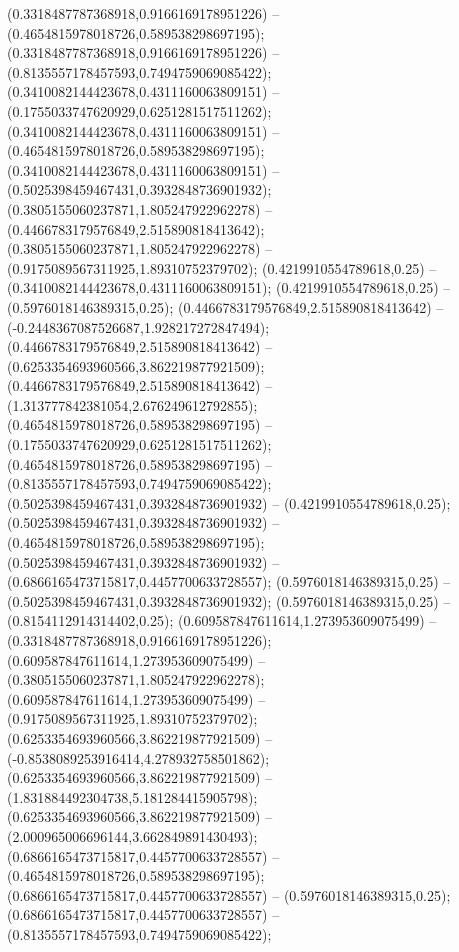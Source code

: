  (0.3318487787368918,0.9166169178951226) -- (0.4654815978018726,0.589538298697195);
 (0.3318487787368918,0.9166169178951226) -- (0.8135557178457593,0.7494759069085422);
 (0.3410082144423678,0.4311160063809151) -- (0.1755033747620929,0.6251281517511262);
 (0.3410082144423678,0.4311160063809151) -- (0.4654815978018726,0.589538298697195);
 (0.3410082144423678,0.4311160063809151) -- (0.5025398459467431,0.3932848736901932);
 (0.3805155060237871,1.805247922962278) -- (0.4466783179576849,2.515890818413642);
 (0.3805155060237871,1.805247922962278) -- (0.9175089567311925,1.89310752379702);
 (0.4219910554789618,0.25) -- (0.3410082144423678,0.4311160063809151);
 (0.4219910554789618,0.25) -- (0.5976018146389315,0.25);
 (0.4466783179576849,2.515890818413642) -- (-0.2448367087526687,1.928217272847494);
 (0.4466783179576849,2.515890818413642) -- (0.6253354693960566,3.862219877921509);
 (0.4466783179576849,2.515890818413642) -- (1.313777842381054,2.676249612792855);
 (0.4654815978018726,0.589538298697195) -- (0.1755033747620929,0.6251281517511262);
 (0.4654815978018726,0.589538298697195) -- (0.8135557178457593,0.7494759069085422);
 (0.5025398459467431,0.3932848736901932) -- (0.4219910554789618,0.25);
 (0.5025398459467431,0.3932848736901932) -- (0.4654815978018726,0.589538298697195);
 (0.5025398459467431,0.3932848736901932) -- (0.6866165473715817,0.4457700633728557);
 (0.5976018146389315,0.25) -- (0.5025398459467431,0.3932848736901932);
 (0.5976018146389315,0.25) -- (0.8154112914314402,0.25);
 (0.609587847611614,1.273953609075499) -- (0.3318487787368918,0.9166169178951226);
 (0.609587847611614,1.273953609075499) -- (0.3805155060237871,1.805247922962278);
 (0.609587847611614,1.273953609075499) -- (0.9175089567311925,1.89310752379702);
 (0.6253354693960566,3.862219877921509) -- (-0.8538089253916414,4.278932758501862);
 (0.6253354693960566,3.862219877921509) -- (1.831884492304738,5.181284415905798);
 (0.6253354693960566,3.862219877921509) -- (2.000965006696144,3.662849891430493);
 (0.6866165473715817,0.4457700633728557) -- (0.4654815978018726,0.589538298697195);
 (0.6866165473715817,0.4457700633728557) -- (0.5976018146389315,0.25);
 (0.6866165473715817,0.4457700633728557) -- (0.8135557178457593,0.7494759069085422);
